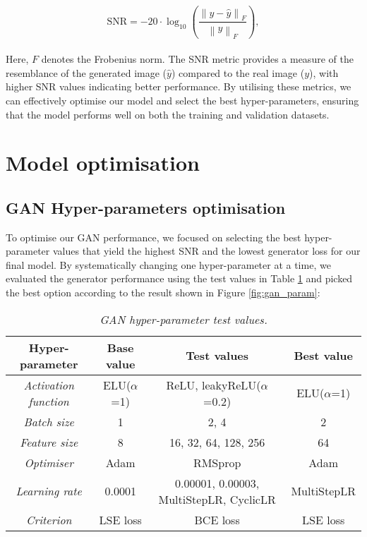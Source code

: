 \begin{equation}
	\mathrm{SNR}=-20 \cdot \log_{10} \left(\frac{\left\|y-\hat{y}\right\|_F}{\left\|y\right\|_F}\right),
	\label{eq:snr}
\end{equation}
\\
Here, $F$ denotes the Frobenius norm. The SNR metric provides a measure of the resemblance of the generated image ($\hat{y}$) compared to the real image ($y$), with higher SNR values indicating better performance. By utilising these metrics, we can effectively optimise our model and select the best hyper-parameters, ensuring that the model performs well on both the training and validation datasets.


\section{Model optimisation} \label{sec:optim}

\subsection{GAN Hyper-parameters optimisation}
To optimise our GAN performance, we focused on selecting the best hyper-parameter values that yield the highest SNR and the lowest generator loss for our final model. By systematically changing one hyper-parameter at a time, we evaluated the generator performance using the test values in Table \ref{tab:gan_param} and picked the best option according to the result shown in Figure \ref{fig:gan_param}:

\begin{table}[ht]
	\centering
	\begin{tabular}{cccc}
		\hline
		\textbf{Hyper-parameter} & \textbf{Base value} & \textbf{Test values} & \textbf{Best value} \\
		\hline
		\textit{Activation function} & ELU($\alpha$=1) & ReLU, leakyReLU($\alpha$=0.2) & ELU($\alpha$=1)\\
		\textit{Batch size} & 1 & 2, 4 & 2 \\
		\textit{Feature size} & 8 & 16, 32, 64, 128, 256 & 64 \\
		\textit{Optimiser} & Adam & RMSprop & Adam \\
		\textit{Learning rate} & 0.0001 & 0.00001, 0.00003, MultiStepLR, CyclicLR & MultiStepLR \\
		\textit{Criterion} & LSE loss & BCE loss & LSE loss\\
		\hline
	\end{tabular}
	\caption{\textit{GAN hyper-parameter test values.}}
	\label{tab:gan_param}
\end{table}

